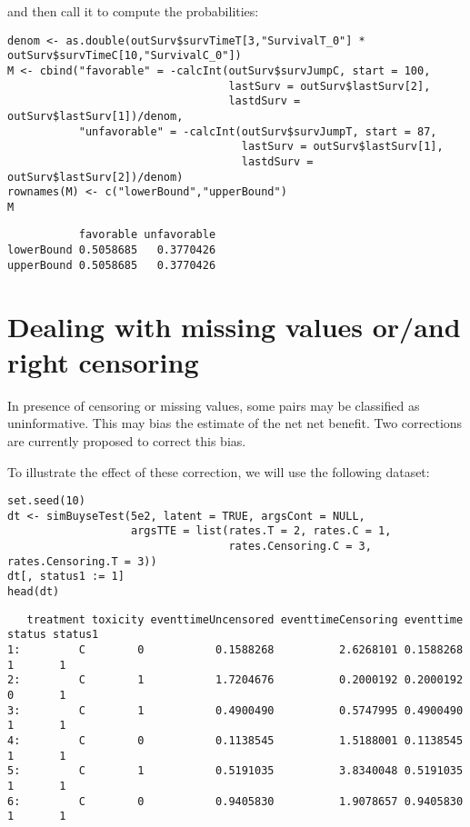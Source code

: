 \documentclass[12pt]{article}
\begin{document}
and then call it to compute the probabilities:
\lstset{language=r,label= ,caption= ,captionpos=b,numbers=none}
\begin{lstlisting}
denom <- as.double(outSurv$survTimeT[3,"SurvivalT_0"] * outSurv$survTimeC[10,"SurvivalC_0"])
M <- cbind("favorable" = -calcInt(outSurv$survJumpC, start = 100, 
								  lastSurv = outSurv$lastSurv[2],
								  lastdSurv = outSurv$lastSurv[1])/denom,
		   "unfavorable" = -calcInt(outSurv$survJumpT, start = 87, 
									lastSurv = outSurv$lastSurv[1],
									lastdSurv = outSurv$lastSurv[2])/denom)
rownames(M) <- c("lowerBound","upperBound")
M
\end{lstlisting}

\begin{verbatim}
           favorable unfavorable
lowerBound 0.5058685   0.3770426
upperBound 0.5058685   0.3770426
\end{verbatim}

\clearpage

\section{Dealing with missing values or/and right censoring}
\label{sec:org76104b1}

In presence of censoring or missing values, some pairs may be
classified as uninformative. This may bias the estimate of the net net
benefit. Two corrections are currently proposed to correct this bias.

\bigskip

To illustrate the effect of these correction, we will use the
following dataset:
\lstset{language=r,label= ,caption= ,captionpos=b,numbers=none}
\begin{lstlisting}
set.seed(10)
dt <- simBuyseTest(5e2, latent = TRUE, argsCont = NULL,
				   argsTTE = list(rates.T = 2, rates.C = 1,
								  rates.Censoring.C = 3, rates.Censoring.T = 3))
dt[, status1 := 1]
head(dt)
\end{lstlisting}

\begin{verbatim}
   treatment toxicity eventtimeUncensored eventtimeCensoring eventtime status status1
1:         C        0           0.1588268          2.6268101 0.1588268      1       1
2:         C        1           1.7204676          0.2000192 0.2000192      0       1
3:         C        1           0.4900490          0.5747995 0.4900490      1       1
4:         C        0           0.1138545          1.5188001 0.1138545      1       1
5:         C        1           0.5191035          3.8340048 0.5191035      1       1
6:         C        0           0.9405830          1.9078657 0.9405830      1       1
\end{verbatim}
\end{document}
